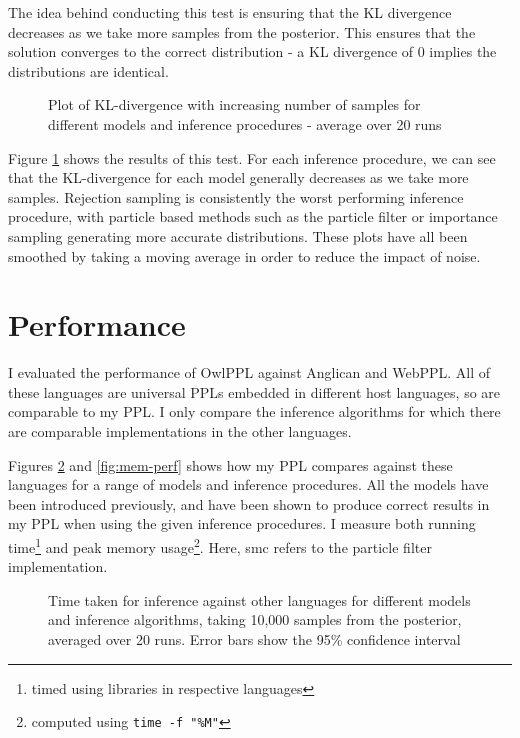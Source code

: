 \documentclass[sigconf]{acmart}
\begin{document}
The idea behind conducting this test is ensuring that the KL divergence decreases as we take more samples from the posterior. This ensures that the solution converges to the correct distribution - a KL divergence of 0 implies the distributions are identical.

\begin{figure}[H]
  \centering
  
  \caption{Plot of KL-divergence with increasing number of samples for different models and inference procedures - average over 20 runs}
  \label{fig:kl}
\end{figure}

Figure \ref{fig:kl} shows the results of this test. For each inference procedure, we can see that the KL-divergence for each model generally decreases as we take more samples. Rejection sampling is consistently the worst performing inference procedure, with particle based methods such as the particle filter or importance sampling generating more accurate distributions. These plots have all been smoothed by taking a moving average in order to reduce the impact of noise.

\section{Performance}

I evaluated the performance of OwlPPL against Anglican and WebPPL. All of these languages are universal PPLs embedded in different host languages, so are comparable to my PPL. I only compare the inference algorithms for which there are comparable implementations in the other languages.

Figures \ref{fig:time-perf} and \ref{fig:mem-perf} shows how my PPL compares against these languages for a range of models and inference procedures. All the models have been introduced previously, and have been shown to produce correct results in my PPL when using the given inference procedures. I measure both running time\footnote{timed using libraries in respective languages} and peak memory usage\footnote{computed using \texttt{time -f "\%M"}}. Here, smc refers to the particle filter implementation.

\begin{figure}[!ht]
  \centering
  
  \caption{Time taken for inference against other languages for different models and inference algorithms, taking 10,000 samples from the posterior, averaged over 20 runs. Error bars show the 95\% confidence interval}
  \label{fig:time-perf}
\end{figure}
\end{document}
